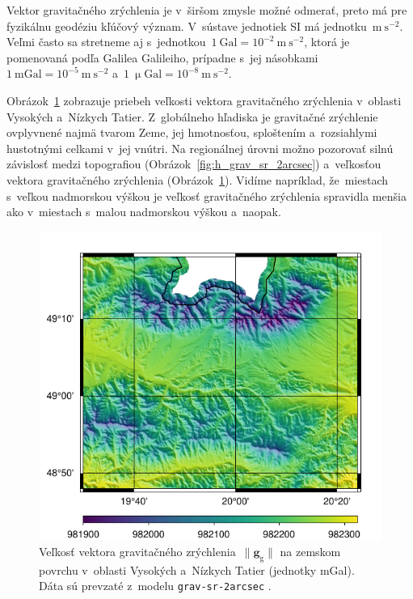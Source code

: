 \documentclass[a4paper,12pt]{book}
\newcommand{\gidx}{\mathrm g}
\let\vec\mathbf
\begin{document}
Vektor gravitačného zrýchlenia je v~širšom zmysle možné odmerať, preto má pre 
fyzikálnu geodéziu kľúčový význam.  V~sústave jednotiek SI má 
jednotku~$\mathrm{m}\ \mathrm{s}^{-2}$.  Veľmi často sa stretneme aj 
s~jednotkou~$1\ \mathrm{Gal} = 10^{-2}\ \mathrm{m}\ \mathrm{s}^{-2}$, ktorá je 
pomenovaná podľa Galilea Galileiho, prípadne s~jej násobkami~$1\ \mathrm{mGal} 
= 10^{-5}\ \mathrm{m}\ \mathrm{s}^{-2}$ a~$1\ \upmu \mathrm{Gal} = 10^{-8}\ 
\mathrm{m}\ \mathrm{s}^{-2}$.

Obrázok~\ref{fig:gg_grav_sr_2arcsec} zobrazuje priebeh veľkosti vektora 
gravitačného zrýchlenia v~oblasti Vysokých a~Nízkych Tatier.  Z~globálneho 
hľadiska je gravitačné zrýchlenie ovplyvnené najmä tvarom Zeme, jej hmotnosťou, 
sploštením a~rozsiahlymi hustotnými celkami v~jej vnútri.  Na regionálnej 
úrovni možno pozorovať silnú závislosť medzi topografiou 
(Obrázok~\ref{fig:h_grav_sr_2arcsec}) a~veľkosťou vektora gravitačného 
zrýchlenia (Obrázok~\ref{fig:gg_grav_sr_2arcsec}).  Vidíme napríklad, 
že~miestach s~veľkou nadmorskou výškou je veľkosť gravitačného zrýchlenia 
spravidla menšia ako v~miestach s~malou nadmorskou výškou a~naopak.

\begin{figure}
\centering
\includegraphics{./fig-gg-grav-sr-2arcsec.pdf}
\caption{Veľkosť vektora gravitačného zrýchlenia~$\| \vec g_\gidx \|$ na 
zemskom povrchu v~oblasti Vysokých a~Nízkych Tatier (jednotky mGal).  Dáta sú 
prevzaté z~modelu \texttt{grav-sr-2arcsec} \parencite{GravSR2arcsec}.}
\label{fig:gg_grav_sr_2arcsec}
\end{figure}
\end{document}
